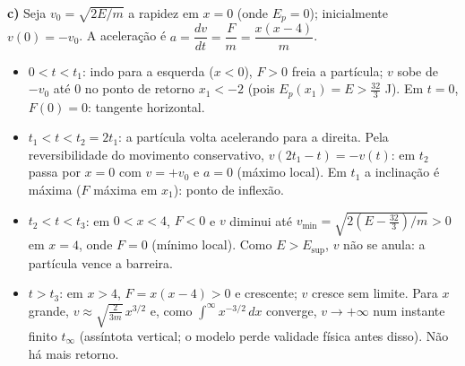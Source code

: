 \documentclass{article}%
\begin{document}
\textbf{c)} Seja $v_0=\sqrt{2E/m}$ a rapidez em $x=0$ (onde $E_p=0$); inicialmente $v(0)=-v_0$. A aceleração é $a=\dfrac{dv}{dt}=\dfrac{F}{m}=\dfrac{x(x-4)}{m}$.
\begin{itemize}
\item $0<t<t_1$: indo para a esquerda ($x<0$), $F>0$ freia a partícula; $v$ sobe de $-v_0$ até $0$ no ponto de retorno $x_1<-2$ (pois $E_p(x_1)=E>\frac{32}{3}$ J). Em $t=0$, $F(0)=0$: tangente horizontal.
\item $t_1<t<t_2=2t_1$: a partícula volta acelerando para a direita. Pela reversibilidade do movimento conservativo, $v(2t_1-t)=-v(t)$: em $t_2$ passa por $x=0$ com $v=+v_0$ e $a=0$ (máximo local). Em $t_1$ a inclinação é máxima ($F$ máxima em $x_1$): ponto de inflexão.
\item $t_2<t<t_3$: em $0<x<4$, $F<0$ e $v$ diminui até $v_{\min}=\sqrt{2\left(E-\frac{32}{3}\right)/m}>0$ em $x=4$, onde $F=0$ (mínimo local). Como $E>E_{\sup}$, $v$ não se anula: a partícula vence a barreira.
\item $t>t_3$: em $x>4$, $F=x(x-4)>0$ e crescente; $v$ cresce sem limite. Para $x$ grande, $v\approx\sqrt{\frac{2}{3m}}\,x^{3/2}$ e, como $\int^{\infty}x^{-3/2}\,dx$ converge, $v\to+\infty$ num instante finito $t_\infty$ (assíntota vertical; o modelo perde validade física antes disso). Não há mais retorno.
\end{itemize}
\end{document}
